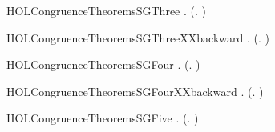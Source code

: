 \newcommand{\HOLCongruenceTheoremsSGTwo}{\UseVerbatim{HOLCongruenceTheoremsSGTwo}}
\begin{SaveVerbatim}{HOLCongruenceTheoremsSGThree}
\HOLTokenTurnstile{} \HOLSymConst{\HOLTokenForall{}} .   \HOLSymConst{\HOLTokenImp{}}  (\HOLTokenLambda{}.  )
\end{SaveVerbatim}
\newcommand{\HOLCongruenceTheoremsSGThree}{\UseVerbatim{HOLCongruenceTheoremsSGThree}}
\begin{SaveVerbatim}{HOLCongruenceTheoremsSGThreeXXbackward}
\HOLTokenTurnstile{} \HOLSymConst{\HOLTokenForall{}}.  (\HOLTokenLambda{}. \HOLConst{\ensuremath{\tau}} ) \HOLSymConst{\HOLTokenImp{}}  
\end{SaveVerbatim}
\newcommand{\HOLCongruenceTheoremsSGThreeXXbackward}{\UseVerbatim{HOLCongruenceTheoremsSGThreeXXbackward}}
\begin{SaveVerbatim}{HOLCongruenceTheoremsSGFour}
\HOLTokenTurnstile{} \HOLSymConst{\HOLTokenForall{}} .   \HOLSymConst{\HOLTokenConj{}}   \HOLSymConst{\HOLTokenImp{}}  (\HOLTokenLambda{}.   \HOLSymConst{\ensuremath{+}}  )
\end{SaveVerbatim}
\newcommand{\HOLCongruenceTheoremsSGFour}{\UseVerbatim{HOLCongruenceTheoremsSGFour}}
\begin{SaveVerbatim}{HOLCongruenceTheoremsSGFourXXbackward}
\HOLTokenTurnstile{} \HOLSymConst{\HOLTokenForall{}} .  (\HOLTokenLambda{}.   \HOLSymConst{\ensuremath{+}}  ) \HOLSymConst{\HOLTokenImp{}}   \HOLSymConst{\HOLTokenConj{}}  
\end{SaveVerbatim}
\newcommand{\HOLCongruenceTheoremsSGFourXXbackward}{\UseVerbatim{HOLCongruenceTheoremsSGFourXXbackward}}
\begin{SaveVerbatim}{HOLCongruenceTheoremsSGFive}
\HOLTokenTurnstile{} \HOLSymConst{\HOLTokenForall{}} .   \HOLSymConst{\HOLTokenConj{}}   \HOLSymConst{\HOLTokenImp{}}  (\HOLTokenLambda{}.   \HOLSymConst{\ensuremath{\parallel}}  )
\end{SaveVerbatim}
